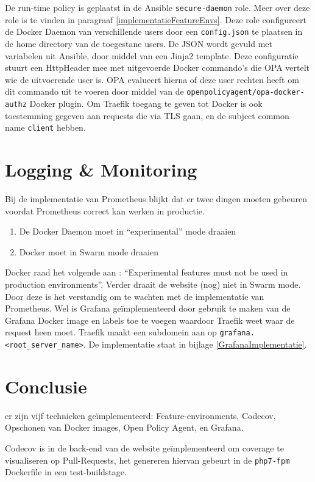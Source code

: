 De run-time policy is geplaatst in de Ansible \texttt{secure-daemon} role. Meer over deze role is te vinden in paragraaf \ref{implementatieFeatureEnvs}. Deze role configureert de Docker Daemon van verschillende users door een \texttt{config.json} te plaatsen in de home directory van de toegestane users. De JSON wordt gevuld met variabelen uit Ansible, door middel van een Jinja2 template. Deze configuratie stuurt een HttpHeader mee met uitgevoerde Docker commando's die OPA vertelt wie de uitvoerende user is. OPA evalueert hierna of deze user rechten heeft om dit commando uit te voeren door middel van de \texttt{openpolicyagent/opa-docker-authz} Docker plugin. Om Traefik toegang te geven tot Docker is ook toestemming gegeven aan requests die via TLS gaan, en de subject common name \texttt{client} hebben.

\section{Logging \& Monitoring}
Bij de implementatie van Prometheus blijkt dat er twee dingen moeten gebeuren voordat Prometheus correct kan werken in productie. 
\begin{enumerate}
    \item De Docker Daemon moet in \enquote{experimental} mode draaien
    \item Docker moet in Swarm mode draaien
\end{enumerate}
Docker raad het volgende aan \parencite{DockerExperimental}: \enquote{Experimental features must not be used in production environments}. Verder draait de website (nog) niet in Swarm mode. Door deze is het verstandig om te wachten met de implementatie van Prometheus. Wel is Grafana geïmplementeerd door gebruik te maken van de Grafana Docker image en labels toe te voegen waardoor Traefik weet waar de request heen moet. Traefik maakt een subdomein aan op \texttt{grafana.<root\_server\_name>}. De implementatie staat in bijlage \ref{GrafanaImplementatie}.

\section{Conclusie}

er zijn vijf technieken geïmplementeerd: Feature-environments, Codecov, Opschonen van Docker images, Open Policy Agent, en Grafana.

Codecov is in de back-end van de website geïmplementeerd om coverage te visualiseren op Pull-Requests, het genereren hiervan gebeurt in de \texttt{php7-fpm} Dockerfile in een test-buildstage.


